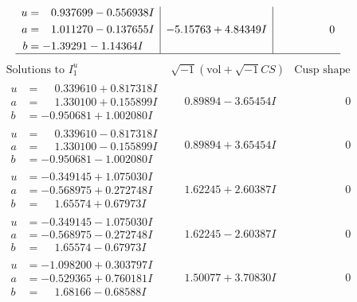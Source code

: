 \documentclass[1p]{elsarticle_modified}
\theoremstyle{definition}
\newcommand{\I}{\sqrt{-1}}
\begin{document}
$$\begin{array}{c|c|c}
\begin{aligned}
u &= \phantom{-}0.937699 - 0.556938 I \\
a &= \phantom{-}1.011270 - 0.137655 I \\
b &= -1.39291 - 1.14364 I\end{aligned}
 & -5.15763 + 4.84349 I & \phantom{-0.000000 } 0\\
 \hline 
 \end{array}$$\newpage$$\begin{array}{c|c|c}  
\text{Solutions to }I^u_{1}& \I (\text{vol} + \sqrt{-1}CS) & \text{Cusp shape}\\
 \hline 
\begin{aligned}
u &= \phantom{-}0.339610 + 0.817318 I \\
a &= \phantom{-}1.330100 + 0.155899 I \\
b &= -0.950681 + 1.002080 I\end{aligned}
 & \phantom{-}0.89894 - 3.65454 I & \phantom{-0.000000 } 0 \\ \hline\begin{aligned}
u &= \phantom{-}0.339610 - 0.817318 I \\
a &= \phantom{-}1.330100 - 0.155899 I \\
b &= -0.950681 - 1.002080 I\end{aligned}
 & \phantom{-}0.89894 + 3.65454 I & \phantom{-0.000000 } 0 \\ \hline\begin{aligned}
u &= -0.349145 + 1.075030 I \\
a &= -0.568975 + 0.272748 I \\
b &= \phantom{-}1.65574 + 0.67973 I\end{aligned}
 & \phantom{-}1.62245 + 2.60387 I & \phantom{-0.000000 } 0 \\ \hline\begin{aligned}
u &= -0.349145 - 1.075030 I \\
a &= -0.568975 - 0.272748 I \\
b &= \phantom{-}1.65574 - 0.67973 I\end{aligned}
 & \phantom{-}1.62245 - 2.60387 I & \phantom{-0.000000 } 0 \\ \hline\begin{aligned}
u &= -1.098200 + 0.303797 I \\
a &= -0.529365 + 0.760181 I \\
b &= \phantom{-}1.68166 - 0.68588 I\end{aligned}
 & \phantom{-}1.50077 + 3.70830 I & \phantom{-0.000000 } 0 \\ \hline\begin{aligned}

\end{aligned}
\end{array}$$
\end{document}
